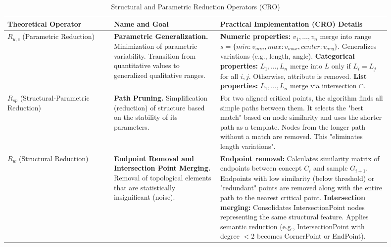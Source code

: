 \documentclass[conference]{IEEEtran}
\begin{document}
\begin{table}[h]
\centering
\caption{Structural and Parametric Reduction Operators (CRO)}
\begin{tabular}{|p{0.25\linewidth}|p{0.25\linewidth}|p{0.4\linewidth}|}
\hline
\textbf{Theoretical Operator} & \textbf{Name and Goal} & \textbf{Practical Implementation (CRO) Details} \\
\hline
$R_{u,c}$ (Parametric Reduction) & \textbf{Parametric Generalization.} Minimization of parametric variability. Transition from quantitative values to generalized qualitative ranges. & \textbf{Numeric properties:} $v_1, \dots, v_n$ merge into range $s = \{min: v_{min}, max: v_{max}, center: v_{avg}\}$. Generalizes variations (e.g., length, angle). \newline \textbf{Categorical properties:} $L_1, \dots, L_n$ merge into $L$ only if $L_i = L_j$ for all $i, j$. Otherwise, attribute is removed. \newline \textbf{List properties:} $L_1, \dots, L_n$ merge via intersection $\cap$. \\
\hline
$R_{sp}$ (Structural-Parametric Reduction) & \textbf{Path Pruning.} Simplification (reduction) of structure based on the stability of its parameters. & For two aligned critical points, the algorithm finds all simple paths between them. It selects the "best match" based on node similarity and uses the shorter path as a template. Nodes from the longer path without a match are removed. This "eliminates length variations". \\
\hline
$R_{w}$ (Structural Reduction) & \textbf{Endpoint Removal and Intersection Point Merging.} Removal of topological elements that are statistically insignificant (noise). & \textbf{Endpoint removal:} Calculates similarity matrix of endpoints between concept $C_i$ and sample $G_{i+1}$. Endpoints with low similarity (below threshold) or "redundant" points are removed along with the entire path to the nearest critical point. \newline \textbf{Intersection merging:} Consolidates IntersectionPoint nodes representing the same structural feature. Applies semantic reduction (e.g., IntersectionPoint with degree $< 2$ becomes CornerPoint or EndPoint). \\
\hline
\end{tabular}
\end{table}
\end{document}
